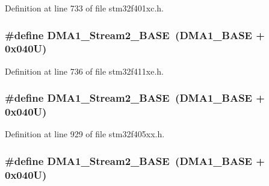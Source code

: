 Definition at line 733 of file stm32f401xc.\+h.

\subsubsection[{\texorpdfstring{D\+M\+A1\+\_\+\+Stream2\+\_\+\+B\+A\+SE}{DMA1_Stream2_BASE}}]{\setlength{\rightskip}{0pt plus 5cm}\#define D\+M\+A1\+\_\+\+Stream2\+\_\+\+B\+A\+SE~({\bf D\+M\+A1\+\_\+\+B\+A\+SE} + 0x040\+U)}\hypertarget{group___peripheral__registers__structures_ga48a551ee91d3f07dd74347fdb35c703d}{}\label{group___peripheral__registers__structures_ga48a551ee91d3f07dd74347fdb35c703d}


Definition at line 736 of file stm32f411xe.\+h.

\subsubsection[{\texorpdfstring{D\+M\+A1\+\_\+\+Stream2\+\_\+\+B\+A\+SE}{DMA1_Stream2_BASE}}]{\setlength{\rightskip}{0pt plus 5cm}\#define D\+M\+A1\+\_\+\+Stream2\+\_\+\+B\+A\+SE~({\bf D\+M\+A1\+\_\+\+B\+A\+SE} + 0x040\+U)}\hypertarget{group___peripheral__registers__structures_ga48a551ee91d3f07dd74347fdb35c703d}{}\label{group___peripheral__registers__structures_ga48a551ee91d3f07dd74347fdb35c703d}


Definition at line 929 of file stm32f405xx.\+h.

\subsubsection[{\texorpdfstring{D\+M\+A1\+\_\+\+Stream2\+\_\+\+B\+A\+SE}{DMA1_Stream2_BASE}}]{\setlength{\rightskip}{0pt plus 5cm}\#define D\+M\+A1\+\_\+\+Stream2\+\_\+\+B\+A\+SE~({\bf D\+M\+A1\+\_\+\+B\+A\+SE} + 0x040\+U)}\hypertarget{group___peripheral__registers__structures_ga48a551ee91d3f07dd74347fdb35c703d}{}\label{group___peripheral__registers__structures_ga48a551ee91d3f07dd74347fdb35c703d}


